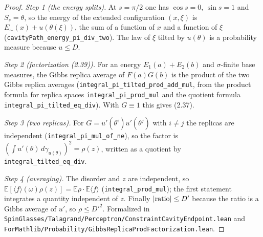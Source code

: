 \begin{proof}
  \leanok
\emph{Step 1 (the energy splits).} At $s=\pi/2$ one has $\cos s=0$, $\sin s=1$ and $S_s=\theta$, so the energy of the extended configuration $(x,\xi)$ is
$E_\sim(x)+u(\theta(\xi))$, the sum of a function of $x$ and a function of $\xi$ (\texttt{cavityPath\_energy\_pi\_div\_two}). The law of $\xi$ tilted by $u(\theta)$
is a probability measure because $u\le D$.

\emph{Step 2 (factorization (2.39)).} For an energy $E_1(a)+E_2(b)$ and $\sigma$-finite base measures, the Gibbs replica average of $F(a)G(b)$ is the product of the two Gibbs replica
averages (\texttt{integral\_pi\_tilted\_prod\_add\_mul}, from the product formula for replica spaces \texttt{integral\_pi\_prod\_mul} and the quotient
formula \texttt{integral\_pi\_tilted\_eq\_div}). With $G\equiv1$ this gives (2.37).

\emph{Step 3 (two replicas).} For $G=u'(\theta^i)u'(\theta^j)$ with $i\ne j$ the replicas are independent (\texttt{integral\_pi\_mul\_of\_ne}), so the factor is
$(\int u'(\theta)\,d\gamma_{u(\theta)})^2=\rho(z)$, written as a quotient by \texttt{integral\_tilted\_eq\_div}.

\emph{Step 4 (averaging).} The disorder and $z$ are independent, so $\mathbb E[\langle f\rangle(\omega)\rho(z)]=\mathbb E\rho\cdot\mathbb E\langle f\rangle$ (\texttt{integral\_prod\_mul});
the first statement integrates a quantity independent of $z$. Finally $|{\rm ratio}|\le D'$ because the ratio is a Gibbs average of $u'$, so $\rho\le D'^2$.
Formalized in \texttt{SpinGlasses/Talagrand/Perceptron/ConstraintCavityEndpoint.lean} and
\texttt{ForMathlib/Probability/GibbsReplicaProdFactorization.lean}.
\end{proof}


